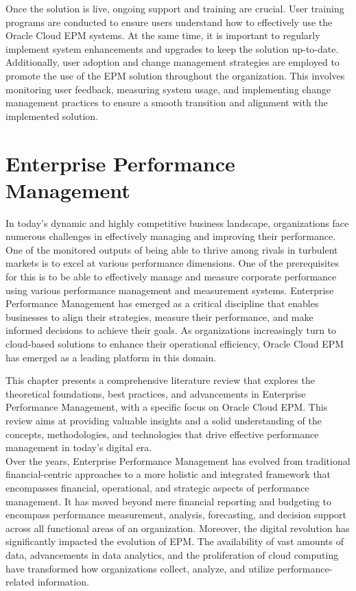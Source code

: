 \documentclass[12pt,a4paper,openright,twoside]{book}
\begin{document}
Once the solution is live, ongoing support and training are crucial. 
%
User training programs are conducted to ensure users understand how to effectively use the Oracle Cloud EPM systems.
%
At the same time, it is important to regularly implement system enhancements and upgrades to keep the solution up-to-date.
%
Additionally, user adoption and change management strategies are employed to promote the use of the EPM solution throughout the organization. 
%
This involves monitoring user feedback, measuring system usage, and implementing change management practices to ensure a smooth transition and alignment with the implemented solution.

\chapter{Enterprise Performance Management}
\label{chap:epm}

In today's dynamic and highly competitive business landscape, organizations face numerous challenges in effectively managing and improving their performance. 
%
One of the monitored outputs of being able to thrive among rivals in turbulent markets is to excel at various performance dimensions. 
%
One of the prerequisites for this is to be able to effectively manage and measure corporate performance using various performance management and measurement systems.
%
Enterprise Performance Management has emerged as a critical discipline that enables businesses to align their strategies, measure their performance, and make informed decisions to achieve their goals. 
%
As organizations increasingly turn to cloud-based solutions to enhance their operational efficiency, Oracle Cloud EPM has emerged as a leading platform in this domain.

This chapter presents a comprehensive literature review that explores the theoretical foundations, best practices, and advancements in Enterprise Performance Management, with a specific focus on Oracle Cloud EPM. 
%
This review aims at providing valuable insights and a solid understanding of the concepts, methodologies, and technologies that drive effective performance management in today's digital era. \\

Over the years, Enterprise Performance Management has evolved from traditional financial-centric approaches to a more holistic and integrated framework that encompasses financial, operational, and strategic aspects of performance management. 
%
It has moved beyond mere financial reporting and budgeting to encompass performance measurement, analysis, forecasting, and decision support across all functional areas of an organization.
%
Moreover, the digital revolution has significantly impacted the evolution of EPM. 
%
The availability of vast amounts of data, advancements in data analytics, and the proliferation of cloud computing have transformed how organizations collect, analyze, and utilize performance-related information.
\end{document}
